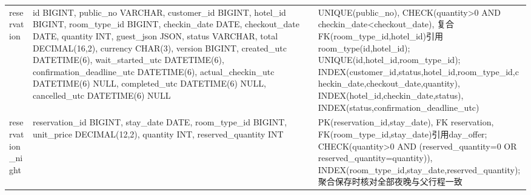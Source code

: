 \documentclass[cn,nofont,11pt,a4paper]{elegantpaper}
\begin{document}
\begin{longtable}{>{\RaggedRight\arraybackslash}p{}>{\RaggedRight\arraybackslash}p{}>{\RaggedRight\arraybackslash}p{}}
reservation & id BIGINT, public\_\allowbreak{}\allowbreak{}no VARCHAR, customer\_\allowbreak{}\allowbreak{}id BIGINT, hotel\_\allowbreak{}\allowbreak{}id BIGINT, room\_\allowbreak{}\allowbreak{}type\_\allowbreak{}\allowbreak{}id BIGINT, checkin\_\allowbreak{}\allowbreak{}date DATE, checkout\_\allowbreak{}\allowbreak{}date DATE, quantity INT, guest\_\allowbreak{}\allowbreak{}json JSON, status VARCHAR, total DECIMAL(16,2), currency CHAR(3), version BIGINT, created\_\allowbreak{}\allowbreak{}utc DATETIME(6), wait\_\allowbreak{}\allowbreak{}started\_\allowbreak{}\allowbreak{}utc DATETIME(6), confirmation\_\allowbreak{}\allowbreak{}deadline\_\allowbreak{}\allowbreak{}utc DATETIME(6), actual\_\allowbreak{}\allowbreak{}checkin\_\allowbreak{}\allowbreak{}utc DATETIME(6) NULL, completed\_\allowbreak{}\allowbreak{}utc DATETIME(6) NULL, cancelled\_\allowbreak{}\allowbreak{}utc DATETIME(6) NULL & UNIQUE(public\_\allowbreak{}\allowbreak{}no), CHECK(quantity>0 AND checkin\_\allowbreak{}\allowbreak{}date<checkout\_\allowbreak{}\allowbreak{}date), 复合FK(room\_\allowbreak{}\allowbreak{}type\_\allowbreak{}\allowbreak{}id,hotel\_\allowbreak{}\allowbreak{}id)引用room\_\allowbreak{}\allowbreak{}type(id,hotel\_\allowbreak{}\allowbreak{}id); UNIQUE(id,hotel\_\allowbreak{}\allowbreak{}id,room\_\allowbreak{}\allowbreak{}type\_\allowbreak{}\allowbreak{}id); INDEX(customer\_\allowbreak{}\allowbreak{}id,status,hotel\_\allowbreak{}\allowbreak{}id,room\_\allowbreak{}\allowbreak{}type\_\allowbreak{}\allowbreak{}id,checkin\_\allowbreak{}\allowbreak{}date,checkout\_\allowbreak{}\allowbreak{}date,quantity), INDEX(hotel\_\allowbreak{}\allowbreak{}id,checkin\_\allowbreak{}\allowbreak{}date,status), INDEX(status,confirmation\_\allowbreak{}\allowbreak{}deadline\_\allowbreak{}\allowbreak{}utc) \\
reservation\_\allowbreak{}\allowbreak{}night & reservation\_\allowbreak{}\allowbreak{}id BIGINT, stay\_\allowbreak{}\allowbreak{}date DATE, room\_\allowbreak{}\allowbreak{}type\_\allowbreak{}\allowbreak{}id BIGINT, unit\_\allowbreak{}\allowbreak{}price DECIMAL(12,2), quantity INT, reserved\_\allowbreak{}\allowbreak{}quantity INT & PK(reservation\_\allowbreak{}\allowbreak{}id,stay\_\allowbreak{}\allowbreak{}date), FK reservation, FK(room\_\allowbreak{}\allowbreak{}type\_\allowbreak{}\allowbreak{}id,stay\_\allowbreak{}\allowbreak{}date)引用day\_\allowbreak{}\allowbreak{}offer; CHECK(quantity>0 AND (reserved\_\allowbreak{}\allowbreak{}quantity=0 OR reserved\_\allowbreak{}\allowbreak{}quantity=quantity)), INDEX(room\_\allowbreak{}\allowbreak{}type\_\allowbreak{}\allowbreak{}id,stay\_\allowbreak{}\allowbreak{}date,reserved\_\allowbreak{}\allowbreak{}quantity); 聚合保存时核对全部夜晚与父行程一致 \\

\end{longtable}
\end{document}
